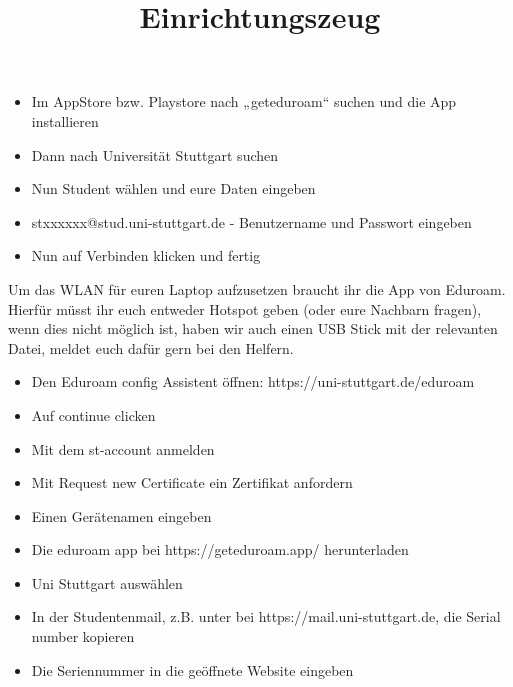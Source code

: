 \documentclass{../../sheet}
\title{Einrichtungszeug}
\begin{document}
\maketitle

\begin{itemize}
	\item Im AppStore bzw. Playstore nach „geteduroam“ suchen und die App installieren
	\item Dann nach Universität Stuttgart suchen
	\item Nun Student wählen und eure Daten eingeben
	\item stxxxxxx@stud.uni-stuttgart.de - Benutzername und Passwort eingeben
	\item Nun auf Verbinden klicken und fertig
\end{itemize}

Um das WLAN für euren Laptop aufzusetzen braucht ihr die App von Eduroam. Hierfür müsst ihr euch entweder Hotspot geben (oder eure Nachbarn fragen), wenn dies nicht möglich ist, haben wir auch einen USB Stick mit der relevanten Datei, meldet euch dafür gern bei den Helfern.

\begin{itemize}
	\item Den Eduroam config Assistent öffnen: https://uni-stuttgart.de/eduroam
	\item Auf continue clicken
	\item Mit dem st-account anmelden
	\item Mit Request new Certificate ein Zertifikat anfordern
	\item Einen Gerätenamen eingeben
	\item Die eduroam app bei https://geteduroam.app/ herunterladen
	\item Uni Stuttgart auswählen
	\item In der Studentenmail, z.B. unter bei https://mail.uni-stuttgart.de, die Serial number kopieren
	\item Die Seriennummer in die geöffnete Website eingeben
\end{itemize}
\end{document}

